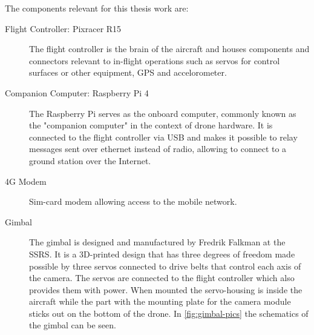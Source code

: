 \documentclass[nofilelist]{cslthse-msc}
\begin{document}
The components relevant for this thesis work are:
\begin{description}
   \item[Flight Controller: Pixracer R15] The flight controller is the brain of the aircraft and houses components and connectors relevant to in-flight operations such as servos for control surfaces or other equipment, GPS and accelorometer.

   \item[Companion Computer: Raspberry Pi 4] The Raspberry Pi serves as the onboard computer, commonly known as the "companion computer" in the context of drone hardware. It is connected to the flight controller via USB and makes it possible to relay messages sent over ethernet instead of radio, allowing to connect to a ground station over the Internet. 
   
   \item[4G Modem] Sim-card modem allowing access to the mobile network. 

   \item[Gimbal] The gimbal is designed and manufactured by Fredrik Falkman at the SSRS. It is a 3D-printed design that has three degrees of freedom made possible by three servos connected to drive belts that control each axis of the camera. The servos are connected to the flight controller which also provides them with power. When mounted the servo-housing is inside the aircraft while the part with the mounting plate for the camera module sticks out on the bottom of the drone. In \ref{fig:gimbal-pics} the schematics of the gimbal can be seen. 
   

\end{description}
\end{document}

